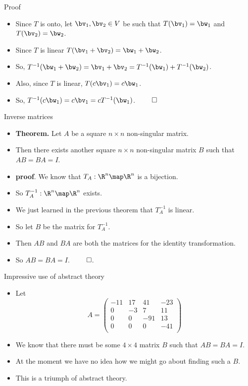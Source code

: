 \documentclass{beamer}
\begin{document}
\begin{frame}{Proof}

\begin{itemize}
\item Since $T$ is onto, let $\bv_1,\bv_2\in V$ be such that $T(\bv_1)=\bw_1$
and $T(\bv_2)=\bw_2$.
\item Since $T$ is linear $T(\bv_1+\bv_2)=\bw_1 + \bw_2$.
\item So, $T^{-1}(\bw_1+\bw_2) = \bv_1+\bv_2= T^{-1}(\bw_1) + T^{-1}(\bw_2)$.
\item Also, since $T$ is linear, $T(c\bv_1) = c\bw_1$.
\item So, $T^{-1}(c\bw_1) = c\bv_1 = cT^{-1}(\bw_1)$. $\qed$
\end{itemize}
\end{frame}
\begin{frame}{Inverse matrices}

\begin{itemize}
\item \textbf{Theorem.} Let $A$ be a square $n\times n$ non-singular matrix.
\item  Then there exists another square $n\times n$ non-singular matrix $B$
such that $AB = BA = I$.
\item \textbf{proof}. We know that $T_A:\R^n\map\R^n$ is a bijection.
\item So $T_A^{-1}:\R^n\map\R^n$ exists.
\item We just learned in the previous theorem that $T_A^{-1}$ is linear.
\item So let $B$ be the matrix for $T_A^{-1}$.
\item Then $AB$ and $BA$ are both the matrices for the identity transformation.
\item So $AB=BA = I$. $\qed$.
\end{itemize}
\end{frame}

\begin{frame}{Impressive use of abstract theory}

\begin{itemize}
\item Let $$A=
\begin{pmatrix}
-11 & 17 &  41  &  -23 \\
 0  & -3 &   7  &   11 \\
 0 &  0  & -91  &   13 \\
 0 &  0  &   0  &   -41 \\
\end{pmatrix}
$$
\item We know that there must be some
$4\times 4$ matrix $B$ such that $AB=BA = I$.
\item At the moment we have no idea how we might go about finding such a $B$.
\item This is a triumph of abstract theory.

\end{itemize}
\end{frame}
\end{document}
